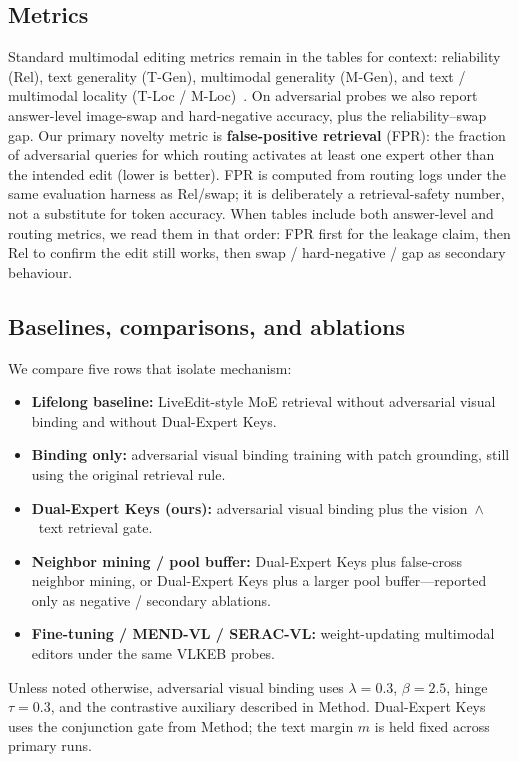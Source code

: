 \documentclass[letterpaper]{article} %
\begin{document}
\subsection{Metrics}
Standard multimodal editing metrics remain in the tables for context: reliability (Rel), text generality (T-Gen), multimodal generality (M-Gen), and text / multimodal locality (T-Loc / M-Loc)~\cite{cheng2023mmedit,huang2024vlkeb}.
On adversarial probes we also report answer-level image-swap and hard-negative accuracy, plus the reliability--swap gap.
Our primary novelty metric is \textbf{false-positive retrieval} (FPR): the fraction of adversarial queries for which routing activates at least one expert other than the intended edit (lower is better).
FPR is computed from routing logs under the same evaluation harness as Rel/swap; it is deliberately a retrieval-safety number, not a substitute for token accuracy.
When tables include both answer-level and routing metrics, we read them in that order: FPR first for the leakage claim, then Rel to confirm the edit still works, then swap / hard-negative / gap as secondary behaviour.

\subsection{Baselines, comparisons, and ablations}
We compare five rows that isolate mechanism:
\begin{itemize}
\item \textbf{Lifelong baseline:} LiveEdit-style MoE retrieval without adversarial visual binding and without Dual-Expert Keys.
\item \textbf{Binding only:} adversarial visual binding training with patch grounding, still using the original retrieval rule.
\item \textbf{Dual-Expert Keys (ours):} adversarial visual binding plus the vision~$\wedge$~text retrieval gate.
\item \textbf{Neighbor mining / pool buffer:} Dual-Expert Keys plus false-cross neighbor mining, or Dual-Expert Keys plus a larger pool buffer---reported only as negative / secondary ablations.
\item \textbf{Fine-tuning / MEND-VL / SERAC-VL:} weight-updating multimodal editors under the same VLKEB probes.
\end{itemize}
Unless noted otherwise, adversarial visual binding uses $\lambda{=}0.3$, $\beta{=}2.5$, hinge $\tau{=}0.3$, and the contrastive auxiliary described in Method.
Dual-Expert Keys uses the conjunction gate from Method; the text margin $m$ is held fixed across primary runs.
\end{document}
